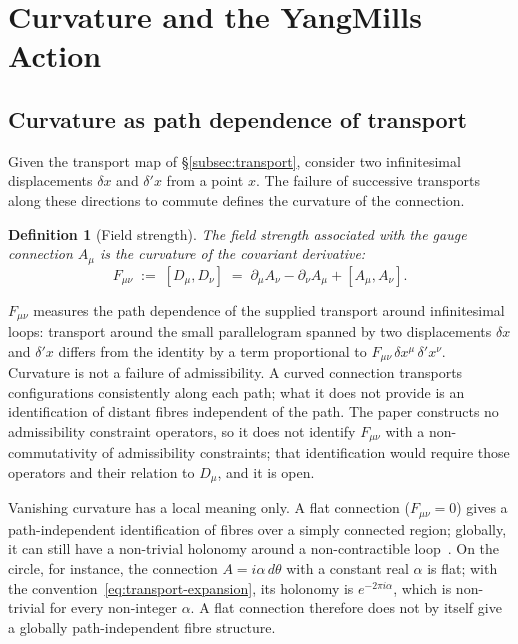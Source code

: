 \documentclass[11pt,a4paper]{article}
\newtheorem{definition}[theorem]{Definition}
\begin{document}
  \section{Curvature and the Yang\textendash Mills Action}
  \label{sec:ym}

  \subsection{Curvature as path dependence of transport}

    Given the transport map of §\ref{subsec:transport}, consider two infinitesimal
    displacements $\delta x$ and $\delta' x$ from a point $x$.
    The failure of successive transports along these directions to commute defines
    the curvature of the connection.

    \begin{definition}[Field strength]
      \label{def:field-strength}
      The \emph{field strength} associated with the gauge connection $A_\mu$ is the
      curvature of the covariant derivative:
      \begin{equation}
        \label{eq:field-strength}
        F_{\mu\nu} \;:=\; [D_\mu, D_\nu]
        \;=\; \partial_\mu A_\nu - \partial_\nu A_\mu + [A_\mu, A_\nu].
      \end{equation}
    \end{definition}

    $F_{\mu\nu}$ measures the path dependence of the supplied transport around infinitesimal loops:
    transport around the small parallelogram spanned by two displacements $\delta x$ and $\delta' x$
    differs from the identity by a term proportional to $F_{\mu\nu}\,\delta x^\mu\,\delta' x^\nu$.
    Curvature is not a failure of admissibility.
    A curved connection transports configurations consistently along each path; what it does not
    provide is an identification of distant fibres independent of the path.
    The paper constructs no admissibility constraint operators, so it does not identify $F_{\mu\nu}$
    with a non-commutativity of admissibility constraints; that identification would require those
    operators and their relation to $D_\mu$, and it is open.

    Vanishing curvature has a local meaning only.
    A flat connection ($F_{\mu\nu} = 0$) gives a path-independent identification of fibres over a
    simply connected region; globally, it can still have a non-trivial holonomy around a
    non-contractible loop~\cite{TongGauge}.
    On the circle, for instance, the connection $A = i\alpha\,d\theta$ with a constant real $\alpha$ is
    flat; with the convention~\eqref{eq:transport-expansion}, its holonomy is $e^{-2\pi i\alpha}$, which
    is non-trivial for every non-integer $\alpha$.
    A flat connection therefore does not by itself give a globally path-independent fibre structure.
\end{document}

